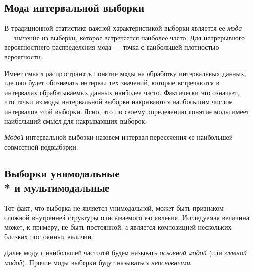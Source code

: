 \documentclass[a5paper,openany]{book}
\begin{document}
\subsection{Мода интервальной выборки} 
\label{ModeSampleSect} 

В традиционной статистике важной характеристикой выборки является ее \emph{мода} 
--- значение из выборки, которое встречается наиболее часто. Для непрерывного 
вероятностного распределения мода --- точка с наибольшей плотностью вероятности. 

Имеет смысл  распространить понятие моды на обработку интервальных данных, где оно 
будет обозначать интервал тех значений, которые встречаются 
в интервалах обрабатываемых данных наиболее часто. Фактически это означает, что 
точки из моды интервальной выборки накрываются наибольшим числом интервалов этой 
выборки. 
Ясно, что по своему определению понятие моды имеет  наибольший смысл для накрывающих выборок. 
\begin{definition} 
	\textsl{Модой} интервальной выборки назовем интервал пересечения ее наибольшей 
	совместной подвыборки.   
\end{definition} 

\subsection[Выборки унимодальные и мультимодальные]%
{Выборки унимодальные \\* и мультимодальные} 
\label{UniMultiModSect} 

Тот факт, что выборка не является унимодальной, может быть признаком сложной 
внутренней структуры описываемого ею явления. 
Исследуемая величина может, к примеру, не быть 
постоянной, а является композицией нескольких близких постоянных величин. 

Далее моду с наибольшей частотой 
будем называть \emph{основной модой} (или \emph{главной модой}). Прочие 
моды выборки будут называться \emph{неосновными}.   


\end{document}
